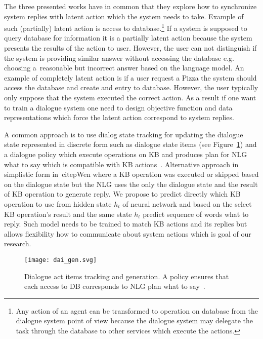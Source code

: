 \documentclass[11pt]{article}
\begin{document}
The three presented works have in common that they explore how to synchronize system replies with latent action which the system needs to take.
Example of such (partially) latent action is access to database.\footnote{Any action of an agent can be transformed to operation on database from the dialogue system point of view because the dialogue system may delegate the task through the database to other services which execute the actions.}
If a system is supposed to query database for information it is a partially latent action because the system presents the results of the action to user.
However, the user can not distinguish if the system is providing similar answer without accessing the database e.g. choosing a~reasonable but incorrect answer based on the language model.
An example of completely latent action is if a user request a Pizza the system should access the database and create and entry to database.
However, the user typically only suppose that the system executed the correct action.
As a result if one want to train a dialogue system one need to design objective function and data representations which force the latent action correspond to system replies.

A common approach is to use dialog state tracking for updating the dialogue state represented in discrete form such as dialogue state items (see Figure~\ref{fig:dai_gen}) and a dialogue policy which execute operations on KB and produces plan for NLG what to say which is compatible with KB actions~\cite{Dusek,young2010hidden}.
Alternative approach in simplistic form in~citep{Wen} where a KB operation was executed or skipped based on the dialogue state but the NLG uses the only the dialogue state and the result of KB operation to generate reply.
We propose to predict directly which KB operation to use from hidden state $h_t$ of neural network and based on the select KB operation's result and the same state $h_t$ predict sequence of words what to reply.
Such model needs to be trained to match KB actions and its replies but allows flexibility how to communicate about system actions which is goal of our research.

\begin{figure}[htpb]
    \centering
    \texttt{[image: dai\_gen.svg]}
    \caption{Dialogue act items tracking and generation. A policy ensures that each access to DB corresponds to NLG plan what to say~\cite{Dusek}.}
    \label{fig:dai_gen}
\end{figure}
\end{document}
